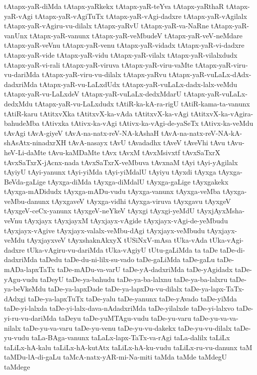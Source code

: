 {tAtapx-yaR-diMda
tAtapx-yaRkekx
tAtapx-yaR-teYva
tAtapx-yaRthaR
tAtapx-yaR-vAgi
tAtapx-yaR-vAgiTuTx
tAtapx-yaR-vAgi-dadxre
tAtapx-yaR-vAgilalx
tAtapx-yaR-vAgiru-vu-dilalx
tAtapx-yaRvU
tAtapx-yaR-va-NaRne
tAtapx-yaR-vanUnx
tAtapx-yaR-vanunx
tAtapx-yaR-veMbudeV
tAtapx-yaR-veV-neMdare
tAtapx-yaR-veVnu
tAtapx-yaR-venu
tAtapx-yaR-vidadx
tAtapx-yaR-vi-dadxre
tAtapx-yaR-vide
tAtapx-yaR-vidu
tAtapx-yaR-vilalx
tAtapx-yaR-vilalxdudx
tAtapx-yaR-vi-rali
tAtapx-yaR-viruva
tAtapx-yaR-viru-vaMte
tAtapx-yaR-viru-vu-dariMda
tAtapx-yaR-viru-vu-dilalx
tAtapx-yaRvu
tAtapx-yaR-vuLaLx-dAdx-dadxriMda
tAtapx-yaR-vu-LaLxdUdx
tAtapx-yaR-vuLaLx-dadx-lalx-veMdu
tAtapx-yaR-vu-LaLxdeV
tAtapx-yaR-vuLaLx-dedxMdarU
tAtapx-yaR-vuLaLx-dedxMdu
tAtapx-yaR-vu-LaLxdudx
tAtiR-ka-kA-ra-rigU
tAtiR-kama-ta-vanunx
tAtiR-karu
tAtitxvXka
tAtitxvX-ka-vAda
tAtitxvX-ka-vAgi
tAtitxvX-ka-vAgira-bahudeMba
tAtivxka
tAtivx-ka-vAgi
tAtivx-ka-vAgi-de-yaSeTx
tAtivx-ka-veMdu
tAvAgi
tAvA-giyeV
tAvA-na-natx-reV-NA-kAshaH
tAvA-na-natx-reV-NA-kA-shAsAtx-ninadxrXH
tAvA-nasayx
tAvU
tAvadadhx
tAveV
tAveVhi
tAvu
tAvu-heV-Li-daMte
tAvu-kaMDaMte
tAvx
tAvxM
tAvxMsivxtf
tAvxSaTxrX
tAvxSaTxrX-jAcnx-nada
tAvxSaTxrX-veMbuva
tAvxnaM
tAyi
tAyi-yAgilalx
tAyiyU
tAyi-yanunx
tAyi-yiMda
tAyi-yiMdalU
tAyiyu
tAyxdi
tAyxga
tAyxga-BeVda-gaLige
tAyxga-diMda
tAyxga-diMdalU
tAyxga-gaLige
tAyxgakekx
tAyxga-mADidudx
tAyxga-mADu-vudu
tAyxga-vanunx
tAyxga-veMba
tAyxga-veMbu-danunx
tAyxgaveV
tAyxga-vidhi
tAyxga-viruva
tAyxgavu
tAyxgeV
tAyxgeV-ceCx-yanunx
tAyxgeV-neYkeV
tAyxgi
tAyxgi-yeMdU
tAyxjAyxMsha-veVnu
tAyxjayx
tAyxjayxM
tAyxjayx-vAgide
tAyxjayx-vAgi-de-yeMbudu
tAyxjayx-vAgive
tAyxjayx-valalx-veMbu-dAgi
tAyxjayx-veMbudu
tAyxjayx-veMdu
tAyxjayxveV
tAyxshaknAkxyX
tUSiNxV-mAsa
tUka-vAda
tUka-vAgi-dadxre
tUka-vAgiru-vu-dariMda
tUka-vAgiyU
tUtu-gaLiMda
ta
taDe
taDe-di-dadxriMda
taDedu
taDe-du-ni-lilx-su-vado
taDe-gaLiMda
taDe-gaLu
taDe-mADa-lapxTaTx
taDe-mADu-va-varU
taDe-yA-dadxriMda
taDe-yAgidadx
taDe-yAgu-vudu
taDeyU
taDe-ya-bahudu
taDe-ya-ba-lalxnu
taDe-ya-ba-lalxru
taDe-ya-beVkeMdu
taDe-ya-lapxDade
taDe-ya-lapxDu-vu-dilalx
taDe-ya-lapx-TaTx-dAdxgi
taDe-ya-lapxTuTx
taDe-yalu
taDe-yanunx
taDe-yAvado
taDe-yiMda
taDe-yi-lalxda
taDe-yi-lalx-dava-nAdadxriMda
taDe-yilalxde
taDe-yi-lalxvo
taDe-yi-ru-vu-dariMda
taDeyu
taDe-yuMTAgu-vudu
taDe-yu-varu
taDe-yu-va-va-nilalx
taDe-yu-va-varu
taDe-yu-venu
taDe-yu-vu-dakekx
taDe-yu-vu-dilalx
taDe-yu-vudu
taLa-BAga-vanunx
taLaLx-lapx-TaTx-va-rAgi
taLa-dalilx
taLiLx
taLiLx-hA-kalu
taLiLx-hA-kutAtx
taLiLx-hA-ku-vudu
taLiLx-ru-vu-danunx
taM
taMDu-lA-di-gaLu
taMcA-natx-yAR-mi-Na-miti
taMda
taMde
taMdegU
taMdege
}
